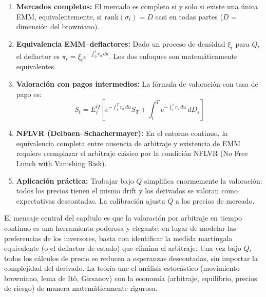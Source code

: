 \documentclass[12pt]{article}
\begin{document}
\begin{enumerate}
  \item \textbf{Mercados completos:} El mercado es completo si y solo si existe una \'unica EMM, equivalentemente, si $\text{rank}(\sigma_t) = D$ casi en todas partes ($D$ = dimensi\'on del browniano).

  \item \textbf{Equivalencia EMM--deflactores:} Dado un proceso de densidad $\xi_t$ para $Q$, el deflactor es $\pi_t = \xi_t e^{-\int_0^t r_u\,du}$. Los dos enfoques son matem\'aticamente equivalentes.

  \item \textbf{Valoraci\'on con pagos intermedios:} La f\'ormula de valoraci\'on con tasa de pago es:
  \[
    S_t = E_t^Q\!\left[e^{-\int_t^T r_u\,du} S_T + \int_t^T e^{-\int_t^s r_u\,du}\,dD_s\right]
  \]

  \item \textbf{NFLVR (Delbaen--Schachermayer):} En el entorno continuo, la equivalencia completa entre ausencia de arbitraje y existencia de EMM requiere reemplazar el arbitraje cl\'asico por la condici\'on NFLVR (No Free Lunch with Vanishing Risk).

  \item \textbf{Aplicaci\'on pr\'actica:} Trabajar bajo $Q$ simplifica enormemente la valoraci\'on: todos los precios tienen el mismo drift y los derivados se valoran como expectativas descontadas. La calibraci\'on ajusta $Q$ a los precios de mercado.
\end{enumerate}

\begin{intuicion}
El mensaje central del cap\'itulo es que la valoraci\'on por arbitraje en tiempo continuo es una herramienta poderosa y elegante: en lugar de modelar las preferencias de los inversores, basta con identificar la medida martingala equivalente (o el deflactor de estado) que elimina el arbitraje. Una vez bajo $Q$, todos los c\'alculos de precio se reducen a esperanzas descontadas, sin importar la complejidad del derivado. La teor\'ia une el an\'alisis estoc\'astico (movimiento browniano, lema de It\^o, Girsanov) con la econom\'ia (arbitraje, equilibrio, precios de riesgo) de manera matem\'aticamente rigurosa.
\end{intuicion}
\end{document}
